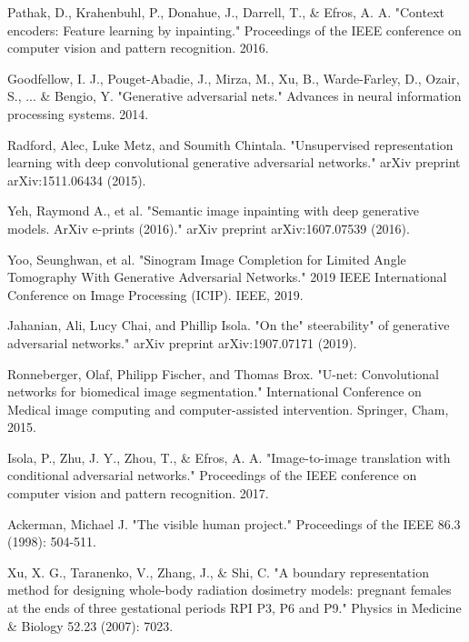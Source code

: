\begin{thebibliography}{00}

Pathak, D., Krahenbuhl, P., Donahue, J., Darrell, T., \& Efros, A. A. "Context encoders: Feature learning by inpainting." Proceedings of the IEEE conference on computer vision and pattern recognition. 2016.

Goodfellow, I. J., Pouget-Abadie, J., Mirza, M., Xu, B., Warde-Farley, D., Ozair, S., ... \& Bengio, Y. "Generative adversarial nets." Advances in neural information processing systems. 2014. 

Radford, Alec, Luke Metz, and Soumith Chintala. "Unsupervised representation learning with deep convolutional generative adversarial networks." arXiv preprint arXiv:1511.06434 (2015).



 Yeh, Raymond A., et al. "Semantic image inpainting with deep generative models. ArXiv e-prints (2016)." arXiv preprint arXiv:1607.07539 (2016).

 Yoo, Seunghwan, et al. "Sinogram Image Completion for Limited Angle Tomography With Generative Adversarial Networks." 2019 IEEE International Conference on Image Processing (ICIP). IEEE, 2019.

Jahanian, Ali, Lucy Chai, and Phillip Isola. "On the" steerability" of generative adversarial networks." arXiv preprint arXiv:1907.07171 (2019).

Ronneberger, Olaf, Philipp Fischer, and Thomas Brox. "U-net: Convolutional networks for biomedical image segmentation." International Conference on Medical image computing and computer-assisted intervention. Springer, Cham, 2015.

Isola, P., Zhu, J. Y., Zhou, T., \& Efros, A. A. "Image-to-image translation with conditional adversarial networks." Proceedings of the IEEE conference on computer vision and pattern recognition. 2017.

Ackerman, Michael J. "The visible human project." Proceedings of the IEEE 86.3 (1998): 504-511.

Xu, X. G., Taranenko, V., Zhang, J., \& Shi, C. "A boundary representation method for designing whole-body radiation dosimetry models: pregnant females at the ends of three gestational periods RPI P3, P6 and P9." Physics in Medicine \& Biology 52.23 (2007): 7023.


\end{thebibliography}
